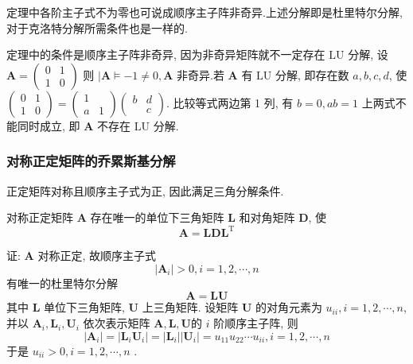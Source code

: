 定理中各阶主子式不为零也可说成顺序主子阵非奇异.上述分解即是杜里特尔分解, 对于克洛特分解所需条件也是一样的.

定理中的条件是顺序主子阵非奇异, 因为非奇异矩阵就不一定存在 $ \mathrm{LU} $ 分解, 设
$
\boldsymbol{A}=\left(\begin{array}{ll}
0 & 1 \\
1 & 0
\end{array}\right)
$
则 $ \mid \boldsymbol{A} \models-1 \neq 0, \boldsymbol{A} $ 非奇异.若 $ \boldsymbol{A} $ 有 $ \mathrm{LU} $ 分解, 即存在数 $ a, b, c, d $, 使
$
\left(\begin{array}{ll}
0 & 1 \\
1 & 0
\end{array}\right)=\left(\begin{array}{ll}
1 & \\
a & 1
\end{array}\right)\left(\begin{array}{ll}
b & d \\
& c
\end{array}\right)
$.
比较等式两边第 1 列, 有
$
b=0, a b=1
$
上两式不能同时成立, 即 $ \boldsymbol{A} $ 不存在 $ \mathrm{LU} $ 分解.


\subsubsection{ 对称正定矩阵的乔累斯基分解}
正定矩阵对称且顺序主子式为正, 因此满足三角分解条件.
\begin{tcolorbox}[enhanced,colback=2,colframe=1,breakable,coltitle=black,title=定理]
对称正定矩阵 $ \boldsymbol{A} $ 存在唯一的单位下三角矩阵 $ \boldsymbol{L} $ 和对角矩阵 $ \boldsymbol{D} $, 使
$$
\boldsymbol{A}=\boldsymbol{L} \boldsymbol{D} \boldsymbol { L } ^ { \mathrm { T } }
$$
\end{tcolorbox}
证: $ \boldsymbol{A} $ 对称正定, 故顺序主子式
$$
\left|\boldsymbol{A}_{i}\right|>0, i=1,2, \cdots, n
$$
有唯一的杜里特尔分解
$$
\boldsymbol{A}=\boldsymbol{L} \boldsymbol{U}
$$
其中 $ \boldsymbol{L} $ 单位下三角矩阵, $ \boldsymbol{U} $ 上三角矩阵.
设矩阵 $ \boldsymbol{U} $ 的对角元素为 $ u_{i i}, i=1,2, \cdots, n $, 并以 $ \boldsymbol{A}_{i}, \boldsymbol{L}_{i}, \boldsymbol{U}_{i} $ 依次表示矩阵 $ \boldsymbol{A}, \boldsymbol{L}, \boldsymbol{U} $的 $ i $ 阶顺序主子阵, 则
$$
\left|\boldsymbol{A}_{i}\right|=\left|\boldsymbol{L}_{i} \boldsymbol{U}_{i}\right|=\left|\boldsymbol{L}_{i}\right|\left|\boldsymbol{U}_{i}\right|=u_{11} u_{22} \cdots u_{i i}, i=1,2, \cdots, n
$$
于是 $ u_{i i}>0, i=1,2, \cdots, n $ .

